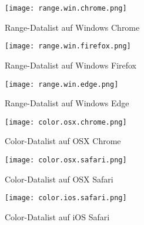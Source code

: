 \begin{figure}[!htb]
    \centering
    \begin{minipage}[b]{0.28\textwidth}
        \centering
        \texttt{[image: range.win.chrome.png]}
        \caption{\centering Range-Datalist auf Windows Chrome}
        \label{img:rangeWinChromeDatalist}
    \end{minipage}
    \hfill
    \begin{minipage}[b]{0.28\textwidth}
        \centering
        \texttt{[image: range.win.firefox.png]}
        \caption{\centering Range-Datalist auf Windows Firefox}
        \label{img:rangeWinFirefoxDatalist}
    \end{minipage}
    \hfill
    \begin{minipage}[b]{0.28\textwidth}
        \centering
        \texttt{[image: range.win.edge.png]}
        \caption{\centering Range-Datalist auf Windows Edge}
        \label{img:rangeWinEdgeDatalist}
    \end{minipage}
\end{figure}


\begin{figure}[!htb]
    \centering
    \begin{minipage}[b]{0.28\textwidth}
        \centering
        \texttt{[image: color.osx.chrome.png]}
        \caption{\centering Color-Datalist auf OSX Chrome}
        \label{img:colorOsxChromeDatalist}
    \end{minipage}
    \hfill
    \begin{minipage}[b]{0.28\textwidth}
        \centering
        \texttt{[image: color.osx.safari.png]}
        \caption{\centering Color-Datalist auf OSX Safari}
        \label{img:colorOsxSafariDatalist}
    \end{minipage}
    \hfill
    \begin{minipage}[b]{0.28\textwidth}
        \centering
        \texttt{[image: color.ios.safari.png]}
        \caption{\centering Color-Datalist auf iOS Safari}
        \label{img:colorIsoSafariDatalist}
    \end{minipage}
\end{figure}

